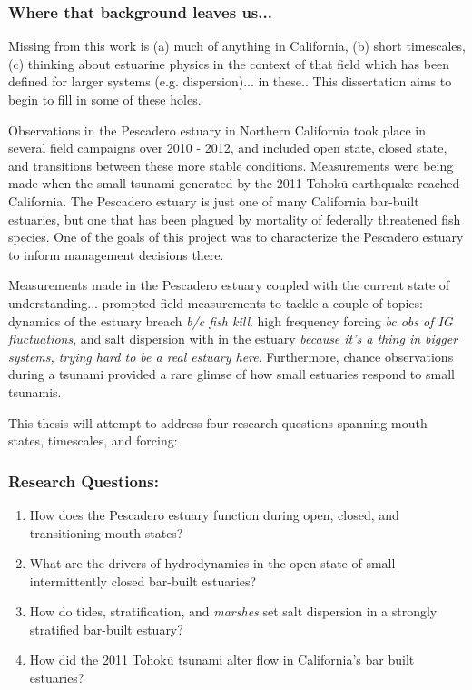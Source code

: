 \subsubsection{Where that background leaves us...}

Missing from this work is (a) much of anything in California, (b) short timescales, (c) thinking about estuarine physics in the context of that field which has been defined for larger systems (e.g. dispersion)... in these.. This dissertation aims to begin to fill in some of these holes. 

Observations in the Pescadero estuary in Northern California took place in several field campaigns over 2010 - 2012, and included open state, closed state, and transitions between these more stable conditions. Measurements were being made when the small tsunami generated by the 2011 Tohok$\overline{\mathrm{u}}$ earthquake reached California. The Pescadero estuary is just one of many California bar-built estuaries, but one that has been plagued by mortality of federally threatened fish species. One of the goals of this project was to characterize the Pescadero estuary to inform management decisions there. 

Measurements made in the Pescadero estuary coupled with the current state of understanding... prompted field measurements to tackle a couple of topics: dynamics of the estuary breach \emph{b/c fish kill}. high frequency forcing \emph{bc obs of IG fluctuations}, and salt dispersion with in the estuary \emph{because it's a thing in bigger systems, trying hard to be a real estuary here}. Furthermore, chance observations during a tsunami provided a rare glimse of how small estuaries respond to small tsunamis. 

This thesis will attempt to address four research questions spanning mouth states, timescales, and forcing: 


\subsubsection{Research Questions:}
\begin{enumerate}
	\item{How does the Pescadero estuary function during open, closed, and transitioning mouth states?}
	\item{What are the drivers of hydrodynamics in the open state of small intermittently closed bar-built estuaries?}
	\item{How do tides, stratification, and \emph{marshes} set salt dispersion in a strongly stratified bar-built estuary?}
	\item{How did the 2011 Tohok$\overline{\mathrm{u}}$ tsunami alter flow in California's bar built estuaries?}
\end{enumerate}

